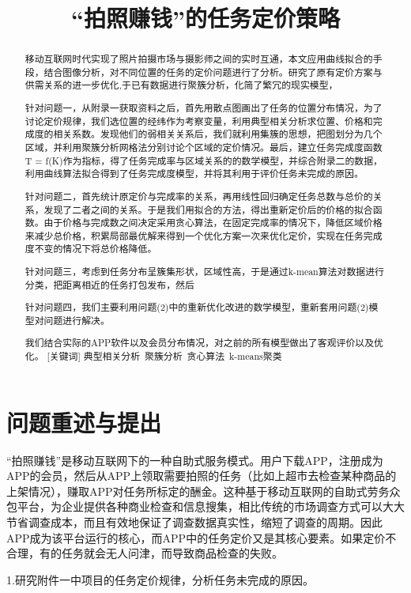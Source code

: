 \documentclass{ctexart}
\title{“拍照赚钱”的任务定价策略}
\date{}
\begin{document}
\maketitle
\begin{abstract}
移动互联网时代实现了照片拍摄市场与摄影师之间的实时互通，本文应用曲线拟合的手段，结合图像分析，对不同位置的任务的定价问题进行了分析。研究了原有定价方案与供需关系的进一步优化,于已有数据进行聚簇分析，化简了繁冗的现实模型，

针对问题一，从附录一获取资料之后，首先用散点图画出了任务的位置分布情况，为了讨论定价规律，我们选位置的经纬作为考察变量，利用典型相关分析求位置、价格和完成度的相关系数。发现他们的弱相关关系后，我们就利用集簇的思想，把图划分为几个区域，并利用聚簇分析网格法分别讨论个区域的定价情况。最后，建立任务完成度函数T = f(K)作为指标，得了任务完成率与区域关系的的数学模型，并综合附录二的数据，利用曲线算法拟合得到了任务完成度模型，并将其利用于评价任务未完成的原因。

针对问题二，首先统计原定价与完成率的关系，再用线性回归确定任务总数与总价的关系，发现了二者之间的关系。于是我们用拟合的方法，得出重新定价后的价格的拟合函数。由于价格与完成数之间决定采用贪心算法，在固定完成率的情况下，降低区域价格来减少总价格，积累局部最优解来得到一个优化方案一次来优化定价，实现在任务完成度不变的情况下将总价格降低。


针对问题三，考虑到任务分布呈簇集形状，区域性高，于是通过k-mean算法对数据进行分类，把距离相近的任务打包发布，然后

针对问题四，我们主要利用问题(2)中的重新优化改进的数学模型，重新套用问题(2)模型对问题进行解决。

我们结合实际的APP软件以及会员分布情况，对之前的所有模型做出了客观评价以及优化。
[关键词] 典型相关分析\ 聚簇分析\ 贪心算法\ k-means聚类
\end{abstract}
\newpage
\section{问题重述与提出}
“拍照赚钱”是移动互联网下的一种自助式服务模式。用户下载APP，注册成为APP的会员，然后从APP上领取需要拍照的任务（比如上超市去检查某种商品的上架情况），赚取APP对任务所标定的酬金。这种基于移动互联网的自助式劳务众包平台，为企业提供各种商业检查和信息搜集，相比传统的市场调查方式可以大大节省调查成本，而且有效地保证了调查数据真实性，缩短了调查的周期。因此APP成为该平台运行的核心，而APP中的任务定价又是其核心要素。如果定价不合理，有的任务就会无人问津，而导致商品检查的失败。

1.研究附件一中项目的任务定价规律，分析任务未完成的原因。
\end{document}
